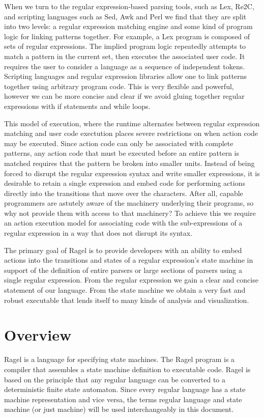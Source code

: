 \documentclass[letterpaper,11pt,oneside]{book}
\begin{document}
When we turn to the regular expression-based parsing tools, such as Lex, Re2C,
and scripting languages such as Sed, Awk and Perl we find that they are split
into two levels: a regular expression matching engine and some kind of program
logic for linking patterns together.  For example, a Lex program is composed of
sets of regular expressions. The implied program logic repeatedly attempts to
match a pattern in the current set, then executes the associated user code. It requires the
user to consider a language as a sequence of independent tokens.  Scripting
languages and regular expression libraries allow one to link patterns together
using arbitrary program code.  This is very flexible and powerful, however we
can be more concise and clear if we avoid gluing together regular expressions
with if statements and while loops.

This model of execution, where the runtime alternates between regular
expression matching and user code exectution places severe restrictions on when
action code may be executed. Since action code can only be associated with
complete patterns, any action code that must be executed before an entire
pattern is matched requires that the pattern be broken into smaller units.
Instead of being forced to disrupt the regular expression syntax and write
smaller expressions, it is desirable to retain a single expression and embed
code for performing actions directly into the transitions that move over the
characters. After all, capable programmers are astutely aware of the machinery
underlying their programs, so why not provide them with access to that
machinery? To achieve this we require an action execution model for associating
code with the sub-expressions of a regular expression in a way that does not
disrupt its syntax.

The primary goal of Ragel is to provide developers with an ability to embed
actions into the transitions and states of a regular expression's state machine
in support of the
definition of entire parsers or large sections of parsers using a single
regular expression.  From the
regular expression we gain a clear and concise statement of our language. From
the state machine we obtain a very fast and robust executable that lends itself
to many kinds of analysis and visualization.

\section{Overview}

Ragel is a language for specifying state machines. The Ragel program is a
compiler that assembles a state machine definition to executable code.  Ragel
is based on the principle that any regular language can be converted to a
deterministic finite state automaton. Since every regular language has a state
machine representation and vice versa, the terms regular language and state
machine (or just machine) will be used interchangeably in this document.
\end{document}
